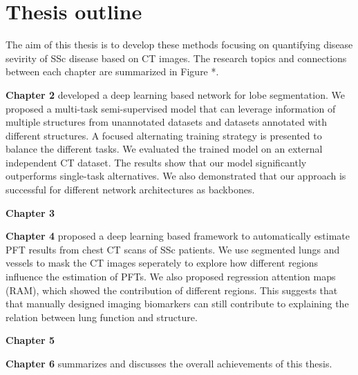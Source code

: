 \section{Thesis outline}

The aim of this thesis is to develop these methods focusing on quantifying disease sevirity of SSc disease based on CT images. The research topics and connections between each chapter are summarized in Figure *. 


\textbf{Chapter 2} developed a deep learning based network for lobe segmentation. We proposed a multi-task semi-supervised model that can leverage information of multiple structures from unannotated datasets and datasets annotated with different structures. A focused alternating training strategy is presented to balance the different tasks. We evaluated the trained model on an external independent CT dataset. The results show that our model significantly outperforms single-task alternatives. We also demonstrated that our approach is successful for different network architectures as backbones. 

\textbf{ Chapter 3} 

\textbf{Chapter 4} proposed a deep learning based framework to automatically estimate PFT results from chest CT scans of SSc patients. We use segmented lungs and vessels to mask the CT images seperately to explore how different regions influence the estimation of PFTs. We also proposed regression attention maps (RAM), which showed the contribution of different regions. This suggests that that manually designed imaging biomarkers can still contribute to explaining the relation between lung function and structure.

\textbf{Chapter 5} 

\textbf{Chapter 6} summarizes and discusses the overall achievements of this thesis.

